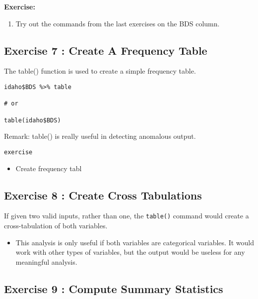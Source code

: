 \documentclass{article}
\begin{document}
\textbf{Exercise:}
\begin{enumerate}
\item Try out the commands from the last exercises on the BDS column.
\end{enumerate}





\subsection*{Exercise 7 : Create A Frequency Table}

The table() function is used to create a simple frequency table.
\begin{framed}
\begin{verbatim}
idaho$BDS %>% table

# or

table(idaho$BDS)
\end{verbatim}
\end{framed}

Remark: table() is really useful in detecting anomalous output.

\texttt{exercise}
\begin{itemize}
\item Create frequency tabl
\end{itemize}


\subsection*{Exercise 8 : Create Cross Tabulations}

If given two valid inputs, rather than one, the \texttt{table()} command would create a cross-tabulation of both variables.

\begin{itemize}
\item This analysis is only useful if both variables are categorical variables. It would work with other types of variables, but the output would be useless for any meaningful analysis.
\end{itemize}



\subsection*{Exercise 9 : Compute Summary Statistics}
\end{document}
